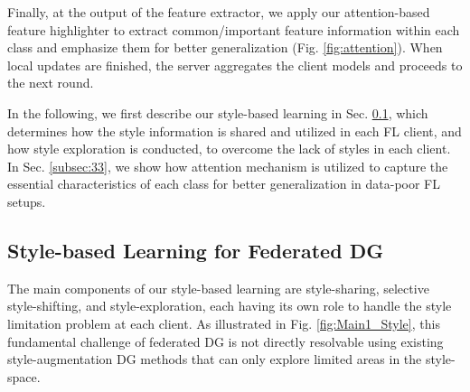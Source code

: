 \documentclass{article}
\theoremstyle{plain}
\theoremstyle{definition}
\theoremstyle{remark}
\begin{document}
Finally, at the output of the feature extractor,  we apply our   attention-based feature highlighter to extract common/important feature information within each class and emphasize them for better generalization   (Fig. \ref{fig:attention}). When local updates are finished, the server aggregates the client models  and proceeds to the next round.





 In the following, we first describe our  style-based learning    in  Sec. \ref{subsec:31}, which determines how the style information is shared and utilized in each FL client, and how  style exploration is conducted, to overcome   the lack of  styles in each client. In Sec.  \ref{subsec:33}, we  show how attention mechanism is utilized  to capture   the essential characteristics  of each class for better generalization in data-poor FL setups.  








\vspace{-1mm}

\subsection{Style-based Learning for Federated DG} \label{subsec:31}
\vspace{-1mm}
  
 The main   components of our style-based learning are style-sharing, selective style-shifting, and style-exploration, each having its own role to handle the style limitation problem at each   client. As illustrated in Fig. \ref{fig:Main1_Style}, this fundamental challenge of federated DG is not directly resolvable using existing style-augmentation DG methods that can only explore   limited areas in the style-space. %
\end{document}
